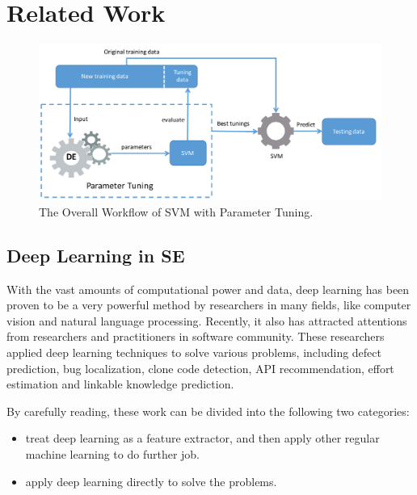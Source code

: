 \section{Related Work}


\begin{figure}
    \centering
    \includegraphics[width=5.45in]{pic/workflow.pdf}
    \caption{The Overall Workflow of SVM with Parameter Tuning.}
    \label{fig:workflow}
\end{figure}


\subsection{Deep Learning in SE}
With the vast amounts of computational power and data, 
deep learning has been proven to be a very powerful method 
by researchers in many fields\cite{lecun2015deep}, like computer vision and natural language processing\cite{krizhevsky2012imagenet,mikolov2013distributed,sutskever2014sequence}. 
Recently, it also has attracted  attentions from researchers and practitioners in software
 community\cite{wang2016automatically, gu2016deep, xu2016predicting,white2016deep,white2015toward,lam2015combining,choetkiertikul2016deep}.
 These researchers applied  deep learning techniques to solve various problems,
 including defect prediction, bug localization, clone code detection, API recommendation, 
 effort estimation and linkable knowledge prediction.
 
By carefully reading, these work can be divided into the following two categories:
 
\begin{itemize}
\item treat deep learning as a feature extractor, and then apply other regular machine learning to do further job.
\item apply deep learning directly to solve the problems.
\end{itemize}

